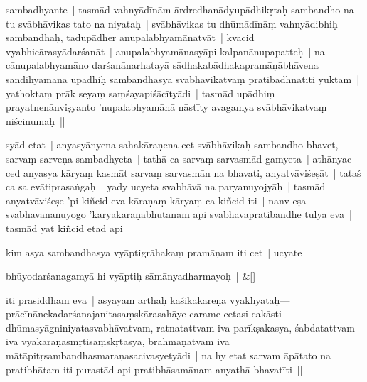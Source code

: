 \documentclass[article,12pt,a4paper]{memoir}%
\newcounter{parCount}
\begin{document}
sambadhyante | tasmād vahnyādīnām ārdredhanādyupādhikṛtaḥ sambandho na tu svābhāvikas tato na niyataḥ | svābhāvikas tu dhūmādīnāṃ vahnyādibhiḥ sambandhaḥ, tadupādher anupalabhyamānatvāt | kvacid vyabhicārasyādarśanāt | anupalabhyamānasyāpi kalpanānupapatteḥ | na cānupalabhyamāno darśanānarhatayā sādhakabādhakapramāṇābhāvena sandihyamāna upādhiḥ sambandhasya svābhāvikatvaṃ pratibadhnātīti yuktam | yathoktaṃ prāk seyaṃ saṃśayapiśācītyādi | tasmād upādhiṃ prayatnenānviṣyanto 'nupalabhyamānā nāstīty avagamya svābhāvikatvaṃ niścinumaḥ ||
	{}
	\pend%
      

	  
	  \pstart \leavevmode%
	\label{thakur75-46.14}syād etat | anyasyānyena sahakāraṇena cet svābhāvikaḥ sambandho bhavet, sarvaṃ sarveṇa sambadhyeta | tathā ca sarvaṃ sarvasmād gamyeta | athānyac ced anyasya kāryaṃ kasmāt sarvaṃ sarvasmān na bhavati, anyatvāviśeṣāt | tataś ca sa evātiprasaṅgaḥ | yady ucyeta svabhāvā na paryanuyojyāḥ | tasmād anyatvāviśeṣe 'pi kiñcid eva kāraṇaṃ kāryaṃ ca kiñcid iti | nanv eṣa svabhāvānanuyogo 'kāryakāraṇabhūtānām api svabhāvapratibandhe tulya eva | tasmād yat kiñcid etad api ||\label{sarit__ratnakīrtinibandhāvali__124304}
	{}
	\pend%
      

	  
	  \pstart \leavevmode%
	\label{thakur75-46.20}kim asya sambandhasya vyāptigrāhakaṃ pramāṇam iti cet | ucyate
	{}
	\pend%
      
	    
	    \stanza[\smallbreak]
	  bhūyodarśanagamyā hi vyāptiḥ sāmānyadharmayoḥ | \&[\smallbreak]
	  
	  
	  

	  
	  \pstart \leavevmode%
	iti prasiddham eva | asyāyam arthaḥ kāśikākāreṇa vyākhyātaḥ—prācīnānekadarśanajanitasaṃskārasahāye carame \label{ratnakīrtinibandhāvali__36r1PF7IMVNAFWNL8S22XY2AOTX}cetasi\label{ratnakīrtinibandhāvali__36r1PF7IMVMGY4ZI43PI8JBSRTA} cakāsti dhūmasyāgniniyatasvabhāvatvam, ratnatattvam iva parīkṣakasya, śabdatattvam iva vyākaraṇasmṛtisaṃskṛtasya, brāhmaṇatvam iva mātāpitṛsambandhasmaraṇasacivasyetyādi | na hy etat sarvam āpātato na pratibhātam iti purastād api pratibhāsamānam anyathā bhavatīti ||
	{}
	\pend%
      
\end{document}
